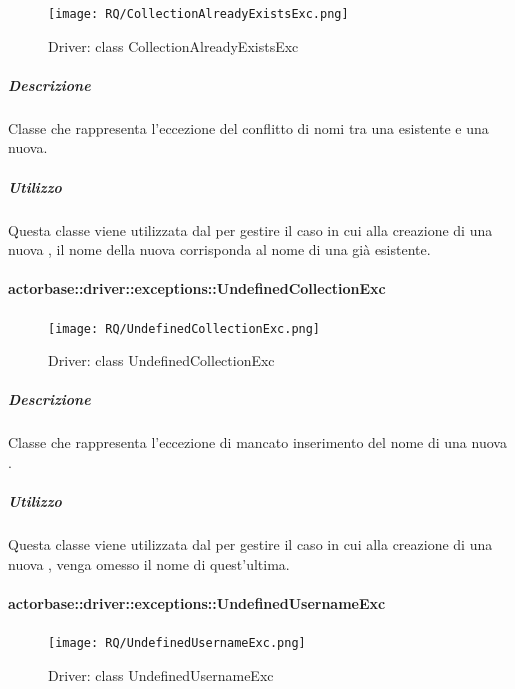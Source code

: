\documentclass{scalatekids-article}
\begin{document}
\begin{figure}[H]
  \begin{center}
    \texttt{[image: RQ/CollectionAlreadyExistsExc.png]}
    \caption{Driver: class CollectionAlreadyExistsExc}
  \end{center}
\end{figure}

\subparagraph{Descrizione}

Classe che rappresenta l'eccezione del conflitto di nomi tra una  esistente e una nuova.

\subparagraph{Utilizzo}

Questa classe viene utilizzata dal  per gestire il caso in cui alla creazione di una nuova , il nome della nuova  corrisponda al nome di una  già esistente.

\paragraph{actorbase::driver::exceptions::UndefinedCollectionExc}

\begin{figure}[H]
  \begin{center}
    \texttt{[image: RQ/UndefinedCollectionExc.png]}
    \caption{Driver: class UndefinedCollectionExc}
  \end{center}
\end{figure}

\subparagraph{Descrizione}

Classe che rappresenta l'eccezione di mancato inserimento del nome di una nuova .

\subparagraph{Utilizzo}

Questa classe viene utilizzata dal  per gestire il caso in cui alla creazione di una nuova , venga omesso il nome di quest'ultima.

\paragraph{actorbase::driver::exceptions::UndefinedUsernameExc}

\begin{figure}[H]
  \begin{center}
    \texttt{[image: RQ/UndefinedUsernameExc.png]}
    \caption{Driver: class UndefinedUsernameExc}
  \end{center}
\end{figure}
\end{document}
